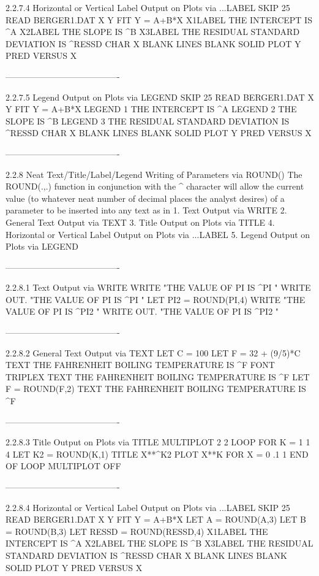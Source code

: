 2.2.7.4
Horizontal or Vertical Label Output on Plots via ...LABEL
      SKIP 25
      READ BERGER1.DAT X Y
      FIT Y = A+B*X
      X1LABEL THE INTERCEPT IS ^A
      X2LABEL THE SLOPE IS ^B
      X3LABEL THE RESIDUAL STANDARD DEVIATION IS ^RESSD
      CHAR X BLANK
      LINES BLANK SOLID
      PLOT Y PRED VERSUS X
 
----------------------------------------
 
2.2.7.5
Legend Output on Plots via LEGEND
      SKIP 25
      READ BERGER1.DAT X Y
      FIT Y = A+B*X
      LEGEND 1 THE INTERCEPT IS ^A
      LEGEND 2 THE SLOPE IS ^B
      LEGEND 3 THE RESIDUAL STANDARD DEVIATION IS ^RESSD
      CHAR X BLANK
      LINES BLANK SOLID
      PLOT Y PRED VERSUS X
 
----------------------------------------
 
2.2.8
Neat Text/Title/Label/Legend Writing of Parameters via ROUND()
   The ROUND(.,.) function in conjunction
   with the ^ character
   will allow the current value (to whatever neat number
   of decimal places the analyst desires) of a parameter
   to be inserted into any text as in
      1. Text Output via WRITE
      2. General Text Output via TEXT
      3. Title Output on Plots via TITLE
      4. Horizontal or Vertical Label Output on Plots via ...LABEL
      5. Legend Output on Plots via LEGEND
 
----------------------------------------
 
2.2.8.1
Text Output via WRITE
      WRITE "THE VALUE OF PI IS ^PI "
      WRITE OUT. "THE VALUE OF PI IS ^PI "
      LET PI2 = ROUND(PI,4)
      WRITE "THE VALUE OF PI IS ^PI2 "
      WRITE OUT. "THE VALUE OF PI IS ^PI2 "
 
----------------------------------------
 
2.2.8.2
General Text Output via TEXT
      LET C = 100
      LET F = 32 + (9/5)*C
      TEXT THE FAHRENHEIT BOILING TEMPERATURE IS ^F
      FONT TRIPLEX
      TEXT THE FAHRENHEIT BOILING TEMPERATURE IS ^F
      LET F = ROUND(F,2)
      TEXT THE FAHRENHEIT BOILING TEMPERATURE IS ^F
 
----------------------------------------
 
2.2.8.3
Title Output on Plots via TITLE
      MULTIPLOT 2 2
      LOOP FOR K = 1 1 4
      LET K2 = ROUND(K,1)
      TITLE X**^K2
      PLOT X**K FOR X = 0 .1 1
      END OF LOOP
      MULTIPLOT OFF
 
----------------------------------------
 
2.2.8.4
Horizontal or Vertical Label Output on Plots via ...LABEL
      SKIP 25
      READ BERGER1.DAT X Y
      FIT Y = A+B*X
      LET A = ROUND(A,3)
      LET B = ROUND(B,3)
      LET RESSD = ROUND(RESSD,4)
      X1LABEL THE INTERCEPT IS ^A
      X2LABEL THE SLOPE IS ^B
      X3LABEL THE RESIDUAL STANDARD DEVIATION IS ^RESSD
      CHAR X BLANK
      LINES BLANK SOLID
      PLOT Y PRED VERSUS X
 
